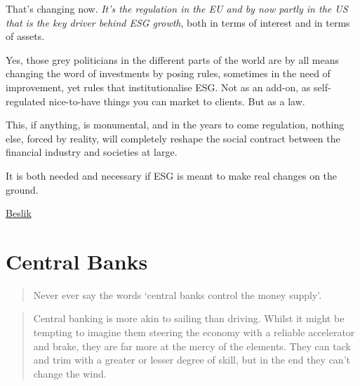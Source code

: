 \documentclass[
]{book}
\begin{document}
That's changing now. \emph{It's the regulation in the EU and by now partly in the US that is the key driver behind ESG growth}, both in terms of interest and in terms of assets.

Yes, those grey politicians in the different parts of the world are by all means changing the word of investments by posing rules, sometimes in the need of improvement, yet rules that institutionalise ESG. Not as an add-on, as self-regulated nice-to-have things you can market to clients. But as a law.

This, if anything, is monumental, and in the years to come regulation, nothing else, forced by reality, will completely reshape the social contract between the financial industry and societies at large.

It is both needed and necessary if ESG is meant to make real changes on the ground.

\href{https://esgonasunday.substack.com/p/week-19-esg-on-a-sunday-turns-1-}{Beslik}

\hypertarget{central-banks-1}{%
\chapter{Central Banks}\label{central-banks-1}}

\begin{quote}
Never ever say the words `central banks control the money supply'.
\end{quote}

\begin{quote}
Central banking is more akin to sailing than driving. Whilst it might be tempting to imagine them steering the economy with a reliable accelerator and brake, they are far more at the mercy of the elements. They can tack and trim with a greater or lesser degree of skill, but in the end they can't change the wind.
\end{quote}
\end{document}
